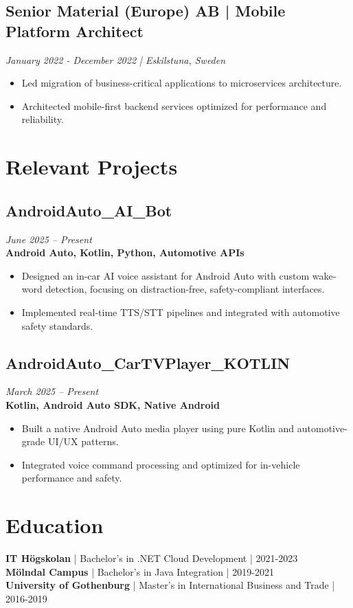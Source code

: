 \documentclass[11pt,a4paper]{article}
\begin{document}
\subsection*{Senior Material (Europe) AB | Mobile Platform Architect}
\textit{January 2022 - December 2022 | Eskilstuna, Sweden}
\begin{itemize}[noitemsep]
\item Led migration of business-critical applications to microservices architecture.
\item Architected mobile-first backend services optimized for performance and reliability.
\end{itemize}

\section*{Relevant Projects}

\subsection{AndroidAuto\_AI\_Bot}
\textit{June 2025 -- Present} \\
\textbf{Android Auto, Kotlin, Python, Automotive APIs}
\begin{itemize}[noitemsep]
  \item Designed an in-car AI voice assistant for Android Auto with custom wake-word detection, focusing on distraction-free, safety-compliant interfaces.
  \item Implemented real-time TTS/STT pipelines and integrated with automotive safety standards.
\end{itemize}

\subsection{AndroidAuto\_CarTVPlayer\_KOTLIN}
\textit{March 2025 -- Present} \\
\textbf{Kotlin, Android Auto SDK, Native Android}
\begin{itemize}[noitemsep]
  \item Built a native Android Auto media player using pure Kotlin and automotive-grade UI/UX patterns.
  \item Integrated voice command processing and optimized for in-vehicle performance and safety.
\end{itemize}

\vspace{6pt}
\section*{Education}
\textbf{IT Högskolan} | Bachelor's in .NET Cloud Development | 2021-2023\\
\textbf{Mölndal Campus} | Bachelor's in Java Integration | 2019-2021\\
\textbf{University of Gothenburg} | Master's in International Business and Trade | 2016-2019
\end{document}

